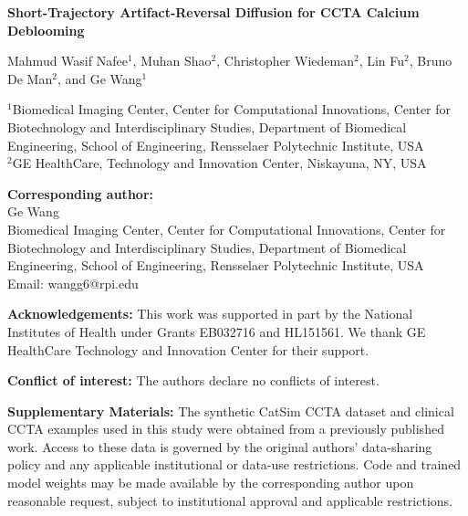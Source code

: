 \documentclass[12pt]{article}
\begin{document}
\begin{center}
    {\Large\bfseries Short-Trajectory Artifact-Reversal Diffusion for CCTA Calcium Deblooming\par}
    \vspace{1.5em}
    {\large Mahmud Wasif Nafee$^{1}$, Muhan Shao$^{2}$, Christopher Wiedeman$^{2}$, Lin Fu$^{2}$, Bruno De Man$^{2}$, and Ge Wang$^{1}$\par}
\end{center}

\vspace{1em}

\noindent
$^{1}$Biomedical Imaging Center, Center for Computational Innovations, Center for Biotechnology and Interdisciplinary Studies, Department of Biomedical Engineering, School of Engineering, Rensselaer Polytechnic Institute, USA\\
$^{2}$GE HealthCare, Technology and Innovation Center, Niskayuna, NY, USA

\vspace{1em}

\noindent\textbf{Corresponding author:}\\
Ge Wang\\
Biomedical Imaging Center, Center for Computational Innovations, Center for Biotechnology and Interdisciplinary Studies, Department of Biomedical Engineering, School of Engineering, Rensselaer Polytechnic Institute, USA\\
Email: wangg6@rpi.edu

\vspace{1em}

\noindent\textbf{Acknowledgements:} This work was supported in part by the National Institutes of Health under Grants EB032716 and HL151561. We thank GE HealthCare Technology and Innovation Center for their support.

\vspace{1em}

\noindent\textbf{Conflict of interest:} The authors declare no conflicts of interest.

\vspace{1em}

\noindent\textbf{Supplementary Materials:} The synthetic CatSim CCTA dataset and clinical CCTA examples used in this study were obtained from a previously published work. Access to these data is governed by the original authors’ data-sharing policy and any applicable institutional or data-use restrictions. Code and trained model weights may be made available by the corresponding author upon reasonable request, subject to institutional approval and applicable restrictions.
\end{document}
